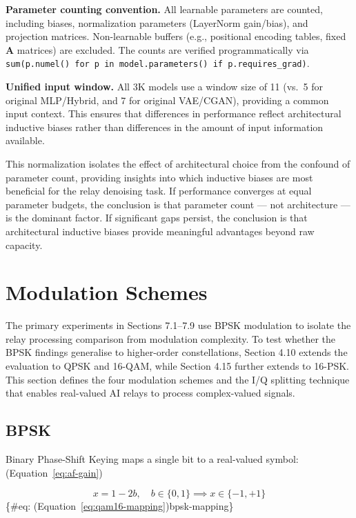 \documentclass[
  english,
  12pt,
  12pt,
  a4paper,
  oneside]{report}
\begin{document}
\textbf{Parameter counting convention.} All learnable parameters are counted, including biases, normalization parameters (LayerNorm gain/bias), and projection matrices. Non-learnable buffers (e.g., positional encoding tables, fixed \(\mathbf{A}\) matrices) are excluded. The counts are verified programmatically via \texttt{sum(p.numel()\ for\ p\ in\ model.parameters()\ if\ p.requires\_grad)}.

\textbf{Unified input window.} All 3K models use a window size of 11 (vs.~5 for original MLP/Hybrid, and 7 for original VAE/CGAN), providing a common input context. This ensures that differences in performance reflect architectural inductive biases rather than differences in the amount of input information available.

This normalization isolates the effect of architectural choice from the confound of parameter count, providing insights into which inductive biases are most beneficial for the relay denoising task. If performance converges at equal parameter budgets, the conclusion is that parameter count --- not architecture --- is the dominant factor. If significant gaps persist, the conclusion is that architectural inductive biases provide meaningful advantages beyond raw capacity.

\section{Modulation Schemes}\label{sec:modulation-schemes}

The primary experiments in Sections 7.1--7.9 use BPSK modulation to isolate the relay processing comparison from modulation complexity. To test whether the BPSK findings generalise to higher-order constellations, Section 4.10 extends the evaluation to QPSK and 16-QAM, while Section 4.15 further extends to 16-PSK. This section defines the four modulation schemes and the I/Q splitting technique that enables real-valued AI relays to process complex-valued signals.

\subsection{BPSK}\label{sec:bpsk}

Binary Phase-Shift Keying maps a single bit to a real-valued symbol: (Equation~\ref{eq:af-gain})

\[x = 1 - 2b, \quad b \in \{0, 1\} \implies x \in \{-1, +1\}
\] \{\#eq: (Equation~\ref{eq:qam16-mapping})bpsk-mapping\}
\end{document}
